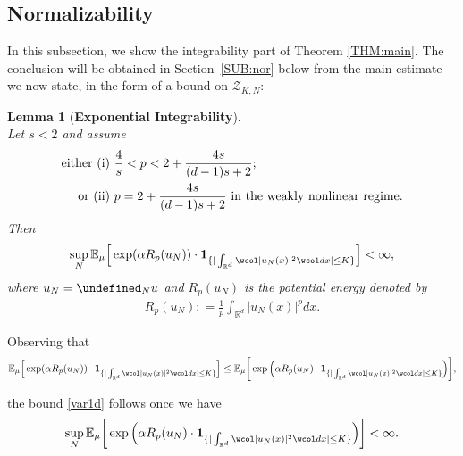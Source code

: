 \documentclass[%
11pt,  reqno]{amsart}
\newtheorem{lemma}[theorem]{Lemma}
\theoremstyle{remarkstyle}
\newcommand{\1}{\hspace{0.2mm}\text{I}\hspace{0.2mm}}
\newcommand{\noi}{\noindent}
\newcommand{\R}{\mathbb{R}}
\let\P= \undefined
\newcommand{\P}{\mathbf{P}}
\newcommand{\E}{\mathbb{E}}
\newcommand{\al}{\alpha}
\newcommand{\wick}[1]{\wcol#1\wcol}
\newcommand{\ind}{\mathbf 1}
\numberwithin{equation}{section}
\numberwithin{theorem}{section}
\begin{document}
	\subsection{Normalizability}
	\label{SEC:nor}
	In this subsection, we show the integrability part of Theorem \ref{THM:main}. The conclusion will be obtained in Section~\ref{SUB:nor} below from the main estimate we now state, in the form of a bound on $\mathcal Z_{K,N}$:
	
	
	\begin{lemma}[\textbf{Exponential Integrability}]\label{lem:exp int}\mbox{}\\
		Let $s<2$ and assume 
		\begin{align}
			\label{condition1}
			\begin{split}
				\textup{either (i) }& \frac{4}{s} < p < 2 + \frac{4s}{(d-1)s+2}; \\
				\textup{or   (ii) } & p = 2+ \frac{4s}{(d-1)s+2} \textup{ in the weakly nonlinear regime}.
			\end{split}
		\end{align}
		Then 
		\begin{align}
			\label{var1d}
			\sup_N \E_{\mu}  \Big[ \exp (\al R_p(u_N)) \cdot  \ind_{\{ | \int_{\R^d} \wick{|u_N (x)|^2} dx| \le K\}}\Big] < \infty,
		\end{align}
		where $u_N = \P_{N} u$ and $R_p(u_N)$ is the potential energy denoted by
		\begin{align}
			\label{RpN}
			R_p (u_N) : = \frac{1}{p} \int_{\R^d} |u_N (x)|^p dx.
		\end{align}
	\end{lemma}
	
	\noi 
	Observing that
	\begin{align*}
		\E_{\mu}  \Big[ \exp (\al R_p(u_N)) \cdot  \ind_{\{ | \int_{\R^d} \wick{|u_N (x)|^2} dx| \le K\}} \Big]
		\le \E_{\mu}  \bigg[ \exp \Big(\al R_p(u_N) \cdot  \ind_{\{ | \int_{\R^d} \wick{|u_N (x)|^2} dx| \le K\}} \Big)\bigg],
	\end{align*}
	
	\noi
	the bound \eqref{var1d} follows once we have
	\begin{align}
		\label{var3}
		\begin{split}
			\sup_N   \E_{\mu}  \bigg[ \exp \Big(\al R_p(u_N) \cdot  \ind_{\{ | \int_{\R^d} \wick{|u_N (x)|^2} dx| \le K\}} \Big)\bigg]  < \infty.
		\end{split}
	\end{align}
	
\end{document}
